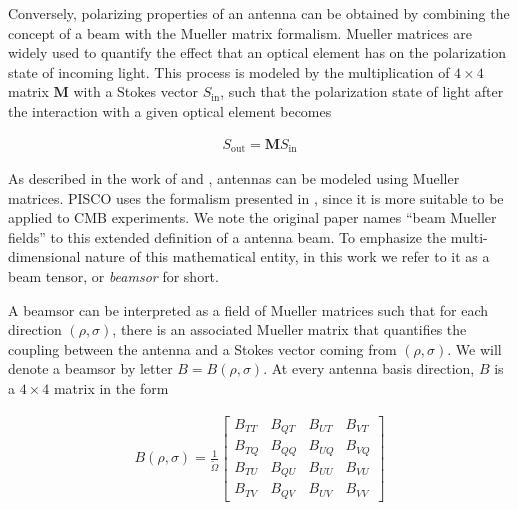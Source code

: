 \documentclass[a4paper,11pt]{article}
\newcommand{\co}{\mathbin{\|}}
\newcommand{\cx}{\mathbin{\times}}
\begin{document}

Conversely, polarizing properties of an antenna can be obtained by combining the concept of a beam with the Mueller matrix formalism. Mueller matrices are widely used to quantify the effect that an optical element has on the polarization state of incoming light. This process is modeled by the multiplication of $4\times4$ matrix $\mathbf{M}$ with a Stokes vector $S_{\mathrm{in}}$, such that the polarization state of light after the interaction with a given optical element becomes

\begin{equation}
\begin{aligned}
S_{\mathrm{out}} = \mathbf{M} S_{\mathrm{in}}
\end{aligned}
\end{equation}

\noindent
As described in the work of \cite{piepmeier_long_njoku_2008} and \cite{2007MNRAS.376.1767O}, antennas can be modeled using Mueller matrices. PISCO uses the formalism presented in \cite{2007MNRAS.376.1767O}, since it is more suitable to be applied to CMB experiments. We note the original paper names ``beam Mueller fields'' to this extended definition of a antenna beam. To emphasize the multi-dimensional nature of this mathematical entity, in this work we refer to it as a beam tensor, or \textsl{beamsor} for short.

A beamsor can be interpreted as a field of Mueller matrices such that for each direction $(\rho,\sigma)$, there is an associated Mueller matrix that quantifies the coupling between the antenna and a Stokes vector coming from $(\rho,\sigma)$. We will denote a beamsor by letter $B = B(\rho,\sigma)$. At every antenna basis direction, $B$ is a $4\times4$ matrix in the form

\begin{equation}
\begin{aligned}
B(\rho,\sigma) = \frac{1}{\tilde{\Omega}}
\begin{bmatrix}
B_{TT} & B_{QT} & B_{UT} & B_{VT}\\
B_{TQ} & B_{QQ} & B_{UQ} & B_{VQ}\\
B_{TU} & B_{QU} & B_{UU} & B_{VU}\\
B_{TV} & B_{QV} & B_{UV} & B_{VV}
\end{bmatrix}
\end{aligned}
\label{eq::beamsor}
\end{equation}
\end{document}
